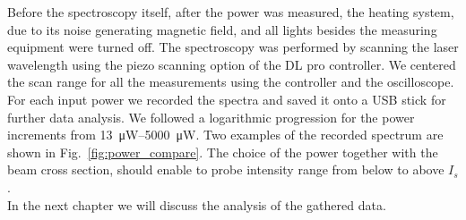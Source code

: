 Before the spectroscopy itself, after the power was measured, the heating system,
due to its noise generating magnetic field, and all lights besides the measuring 
equipment were turned off. The spectroscopy was performed by scanning the laser 
wavelength using the piezo scanning option of the DL pro controller. We centered 
the scan range for all the measurements using the controller and the oscilloscope. 
For each input power we recorded the spectra and saved it onto a USB stick for 
further data analysis. We followed a logarithmic progression for the power 
increments from \SIrange{13}{5000}{\micro\watt}. Two examples of the recorded 
spectrum are shown in Fig.~\ref{fig:power_compare}. The choice of the power 
together with the beam cross section, should enable to probe intensity range from 
below to above \(I_{s}\). \\
In the next chapter we will discuss the analysis of the gathered data. 




